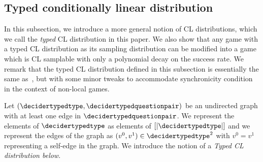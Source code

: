 \subsection{Typed conditionally linear distribution}
In this subsection, we introduce a more general notion of CL distributions, which we call the \textit{typed} CL distribution in this paper. We also show that any game with a typed CL distribution as its sampling distribution can be modified into a game which is CL samplable with only a polynomial decay on the success rate. We remark that the typed CL distribution defined in this subsection is essentially the same as~\cite[Section 4, Section 6]{jiMIPRE2022a}, but with some minor tweaks to accommodate synchronicity condition in the context of non-local games. 

Let $(\decidertypedtype, \decidertypedquestionpair)$ be an undirected graph with at least one edge in $\decidertypedquestionpair$. We represent the elements of $\decidertypedtype$ as elements of $[|\decidertypedtype|]$ and we represent the edges of the graph as $(v^0, v^1) \in \decidertypedtype^2$ with $v^0 = v^1$ representing a self-edge in the graph. We introduce the notion of a \textit{Typed CL distribution below}. 


